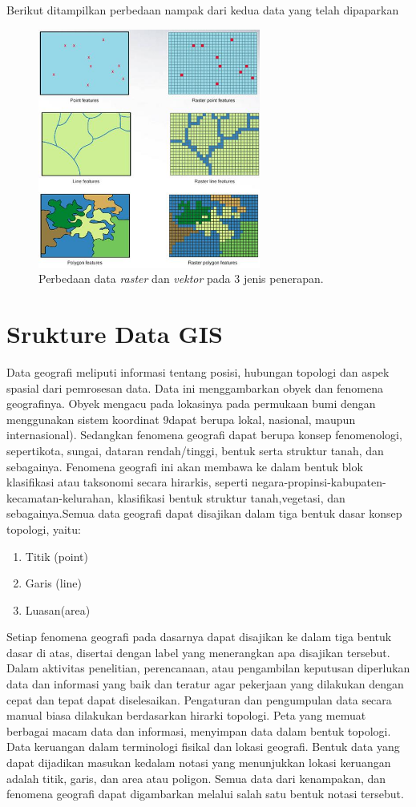 Berikut ditampilkan perbedaan nampak dari kedua data yang telah dipaparkan
		\begin{figure}[htbp]
		\centering
		\includegraphics[width=0.65\textwidth]{pictures/perbedaan.jpg}
		\caption{Perbedaan data \textit{raster} dan \textit{vektor} pada 3 jenis penerapan.}
		\label{labelgambar6}
		\end{figure}
\section{Srukture Data GIS}
Data geografi meliputi informasi tentang posisi, hubungan topologi dan aspek spasial dari pemrosesan data. Data ini menggambarkan obyek dan fenomena geografinya. Obyek mengacu pada lokasinya pada permukaan bumi dengan menggunakan sistem koordinat 9dapat berupa lokal, nasional, maupun internasional). Sedangkan fenomena geografi dapat berupa konsep fenomenologi, sepertikota, sungai, dataran rendah/tinggi, bentuk serta struktur tanah, dan sebagainya. Fenomena geografi ini akan membawa ke dalam bentuk blok klasifikasi atau taksonomi secara hirarkis, seperti negara-propinsi-kabupaten-kecamatan-kelurahan, klasifikasi bentuk struktur tanah,vegetasi, dan sebagainya.Semua data geografi dapat disajikan dalam tiga bentuk dasar konsep topologi, yaitu:
\begin{enumerate}
\item Titik (point)
\item Garis (line)
\item Luasan(area)
\end{enumerate}
Setiap fenomena geografi pada dasarnya dapat disajikan ke dalam tiga bentuk dasar di atas, disertai dengan label yang menerangkan apa disajikan tersebut. Dalam aktivitas penelitian, perencanaan, atau pengambilan keputusan diperlukan data dan informasi yang baik dan teratur agar pekerjaan yang dilakukan dengan cepat dan tepat dapat diselesaikan. Pengaturan dan pengumpulan data secara manual biasa dilakukan berdasarkan hirarki topologi. Peta yang memuat berbagai macam data dan informasi, menyimpan data dalam bentuk topologi. Data keruangan dalam terminologi fisikal dan lokasi geografi. Bentuk data yang dapat dijadikan masukan kedalam notasi yang menunjukkan lokasi keruangan adalah titik, garis, dan area atau poligon. Semua data dari kenampakan, dan fenomena geografi dapat digambarkan melalui salah satu bentuk notasi tersebut.


